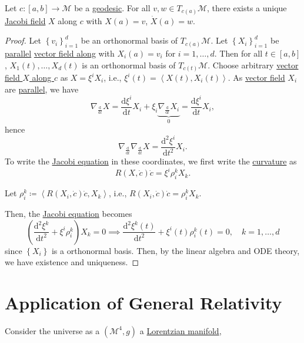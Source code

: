 \begin{theorem}
	Let \(c\colon [a, b] \to \mathcal{M} \) be a \hyperref[def:geodesic]{geodesic}. For all \(v, w\in T_{c(a)}\mathcal{M} \), there exists a unique \hyperref[def:Jacobi-field]{Jacobi field} \(X\) along \(c\) with \(X(a) = v\), \(\dot{X} (a) = w\).
\end{theorem}
\begin{proof}
	Let \(\left\{ v_i \right\} _{i=1}^d\) be an orthonormal basis of \(T_{c(a)} \mathcal{M} \). Let \(\left\{ X_i \right\} _{i=1}^d\) be \hyperref[def:parallel]{parallel} \hyperref[def:vector-field-along-curve]{vector field along} with \(X_i(a) = v_i\) for \(i = 1, \ldots , d\). Then for all \(t\in [a, b]\), \(X_1(t), \ldots , X_d(t)\) is an orthonormal basis of \(T_{c(t)}\mathcal{M} \). Choose arbitrary \hyperref[def:vector-field-along-curve]{vector field \(X\) along \(c\)} as \(X = \xi ^i X_i\), i.e., \(\xi ^i(t) = \left\langle X(t), X_i(t) \right\rangle \). As \hyperref[def:vector-field-along-curve]{vector field} \(X_i\) are \hyperref[def:parallel]{parallel}, we have
	\[
		\nabla _{\frac{\mathrm{d}}{\mathrm{d}t} } X
		= \frac{\mathrm{d}\xi ^i}{\mathrm{d}t} X_i + \xi _i \underbrace{\nabla _{\frac{\mathrm{d}}{\mathrm{d}t} } X_i }_{0}
		= \frac{\mathrm{d}\xi ^i}{\mathrm{d}t} X_i,
	\]
	hence
	\[
		\nabla _{\frac{\mathrm{d}}{\mathrm{d}t} }\nabla _{\frac{\mathrm{d}}{\mathrm{d}t} }X = \frac{\mathrm{d}^2 \xi ^i}{\mathrm{d}t^2} X_i .
	\]
	To write the \hyperref[eq:Jacobi]{Jacobi equation} in these coordinates, we first write the \hyperref[def:Riemannian-curvature]{curvature} as
	\[
		R(X, \dot{c} ) \dot{c} = \xi ^i \rho _i^k X_k.
	\]
	\begin{notation}[Rotation]
		Let \(\rho _i^k \coloneqq \left\langle R(X_i, \dot{c} )\dot{c}, X_k \right\rangle \), i.e., \(R(X_i, \dot{c} )\dot{c} = \rho _i^k X_k \).
	\end{notation}
	Then, the \hyperref[eq:Jacobi]{Jacobi equation} becomes
	\[
		\left( \frac{\mathrm{d}^2 \xi ^k}{\mathrm{d}t^2} + \xi ^i \rho _i^k \right) X_k = 0
		\implies \frac{\mathrm{d}^2 \xi ^k(t)}{\mathrm{d}t^2}  + \xi ^i(t) \rho _i^k(t) = 0,\quad k = 1, \ldots , d
	\]
	since \(\left\{ X_i \right\} \) is a orthonormal basis. Then, by the linear algebra and ODE theory, we have existence and uniqueness.
\end{proof}

\section{Application of General Relativity}
Consider the universe as a \((\mathcal{M} ^4, g)\) a \hyperref[def:Lorentzian-metric]{Lorentzian manifold},
\begin{center}
\end{center}

